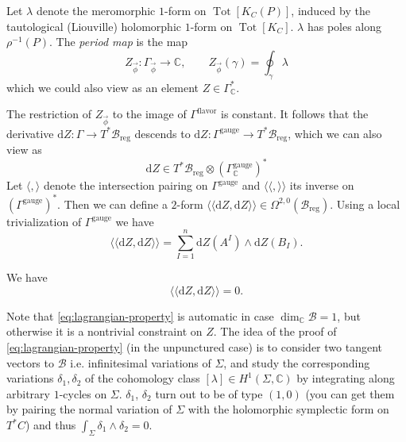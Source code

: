 \documentclass[12pt,letterpaper,reqno]{article}
\numberwithin{equation}{section}
\newcommand{\cB}{\ensuremath{\mathcal B}}
\newcommand{\C}{\ensuremath{\mathbb C}}
\newcommand{\de}{\mathrm{d}}
\newcommand{\reg}{\mathrm{reg}}
\newcommand{\gauge}{\mathrm{gauge}}
\newcommand{\flavor}{\mathrm{flavor}}
\newcommand{\IP}[1]{\langle#1\rangle}
\newcommand{\DIP}[1]{\langle\!\langle#1\rangle\!\rangle}
\newcommand{\vphi}{{\vec\phi}}
\newcommand{\ti}[1]{\textit{#1}}
\DeclareMathOperator{\rank}{rank}
\DeclareMathOperator{\Tot}{Tot}
\begin{document}
\begin{defn}
Let $\lambda$ denote the meromorphic $1$-form on $\Tot[K_C(P)]$,
induced by the tautological (Liouville) holomorphic $1$-form
on $\Tot[K_C]$.
$\lambda$ has poles along $\rho^{-1}(P)$.
The \ti{period map} is the map
\begin{equation}
   Z_\vphi: \Gamma_\vphi \to \C, \qquad Z_\vphi(\gamma) = \oint_\gamma \lambda
\end{equation}
which we could also view as an element $Z \in \Gamma^*_\C$.
\end{defn}
The restriction of $Z_\vphi$ to the image of $\Gamma^\flavor$ is constant. 
It follows that the derivative $\de Z: \Gamma \to T^* \cB_\reg$ descends to
$\de Z: \Gamma^\gauge \to T^* \cB_\reg$,
which we can also view as
\begin{equation}
  \de Z \in T^* \cB_\reg \otimes (\Gamma_\C^\gauge)^*
\end{equation}
Let $\IP{,}$ denote the intersection pairing on $\Gamma^\gauge$
and $\DIP{,}$ its inverse on $(\Gamma^\gauge)^*$.
Then we can define a $2$-form
$\DIP{\de Z,  \de Z} \in \Omega^{2,0}(\cB_\reg)$.
Using a local trivialization of $\Gamma^\gauge$ we have
\begin{equation}
  \DIP{\de Z,  \de Z} = \sum_{I=1}^n \de Z(A^I) \wedge \de Z(B_I).
\end{equation}


\begin{prop} We have
\begin{equation}  \label{eq:lagrangian-property}
\DIP{\de Z, \de Z} = 0.
\end{equation}
\end{prop}

Note that \eqref{eq:lagrangian-property} is automatic in case
$\dim_\C \cB = 1$, but otherwise it is a nontrivial
constraint on $Z$. The idea of the proof
of \eqref{eq:lagrangian-property} (in the unpunctured case)
is to consider two
tangent vectors to $\cB$ i.e. infinitesimal variations 
of $\Sigma$, and study the corresponding variations 
$\delta_1, \delta_2$ of 
the cohomology class $[\lambda] \in H^1(\Sigma,\C)$ 
by integrating along arbitrary
$1$-cycles on $\Sigma$. $\delta_1$, $\delta_2$ turn out to be
of type $(1,0)$
(you can get them by pairing the normal variation of $\Sigma$
with the holomorphic symplectic form on $T^* C$)
and thus
$\int_\Sigma \delta_1 \wedge \delta_2 = 0$.
\end{document}
